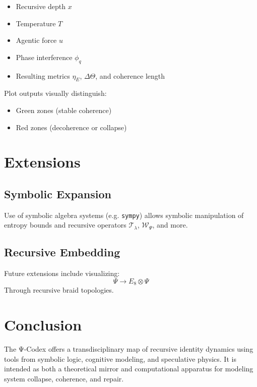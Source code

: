 \documentclass[11pt]{article}
\begin{document}
\begin{itemize}
  \item Recursive depth \( x \)
  \item Temperature \( T \)
  \item Agentic force \( u \)
  \item Phase interference \( \phi_q \)
  \item Resulting metrics \( \eta_E \), \( \Delta\Theta \), and coherence length
\end{itemize}

Plot outputs visually distinguish:
\begin{itemize}
  \item Green zones (stable coherence)
  \item Red zones (decoherence or collapse)
\end{itemize}

\section{Extensions}

\subsection{Symbolic Expansion}
Use of symbolic algebra systems (e.g. \texttt{sympy}) allows symbolic manipulation of entropy bounds and recursive operators \( \mathcal{T}_\lambda \), \( \mathcal{W}_\Psi \), and more.

\subsection{Recursive Embedding}
Future extensions include visualizing:
\[
\Psi \to E_8 \otimes \Psi
\]
Through recursive braid topologies.

\section{Conclusion}
The Ψ-Codex offers a transdisciplinary map of recursive identity dynamics using tools from symbolic logic, cognitive modeling, and speculative physics. It is intended as both a theoretical mirror and computational apparatus for modeling system collapse, coherence, and repair.
\end{document}

